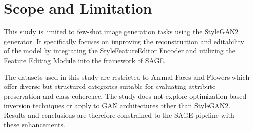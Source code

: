 \section{Scope and Limitation}

This study is limited to few-shot image generation tasks using the StyleGAN2 generator. 
It specifically focuses on improving the reconstruction and editability of the model by integrating the 
StyleFeatureEditor Encoder and utilizing the Feature Editing Module into the framework of SAGE.

The datasets used in this study are restricted to Animal Faces and Flowers
 which offer diverse but structured categories suitable for evaluating attribute preservation and class coherence. 
 The study does not explore optimization-based inversion techniques or apply to GAN architectures other than StyleGAN2. 
 Results and conclusions are therefore constrained to the SAGE pipeline with these enhancements.
